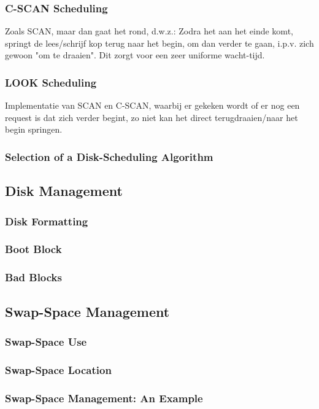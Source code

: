 \subsubsection{C-SCAN Scheduling}
Zoals SCAN, maar dan gaat het rond, d.w.z.: Zodra het aan het einde komt, springt de lees/schrijf kop terug naar het begin, om dan verder te gaan, i.p.v. zich gewoon "om te draaien". Dit zorgt voor een zeer uniforme wacht-tijd.
\subsubsection{LOOK Scheduling}
Implementatie van SCAN en C-SCAN, waarbij er gekeken wordt of er nog een request is dat zich verder begint, zo niet kan het direct terugdraaien/naar het begin springen.
\subsubsection{Selection of a Disk-Scheduling Algorithm}

\subsection{Disk Management}
\subsubsection{Disk Formatting}
\subsubsection{Boot Block}
\subsubsection{Bad Blocks}
\subsection{Swap-Space Management}
\subsubsection{Swap-Space Use}
\subsubsection{Swap-Space Location}
\subsubsection{Swap-Space Management: An Example}
